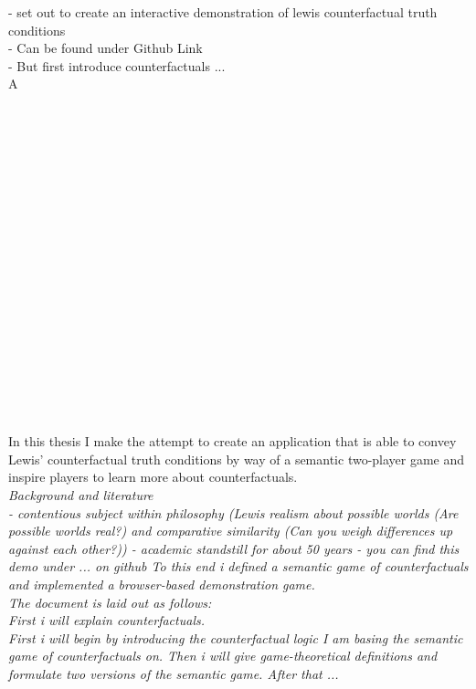 \documentclass[a4paper,american,10pt]{paper}
\theoremstyle{definition}\newtheorem{definition}{Definition}
\begin{document}
- set out to create an interactive demonstration of lewis counterfactual truth conditions\\
- Can be found under Github Link\\
- But first introduce counterfactuals ...\\
A\\\\\\\\\\\\\\\\\\\\\\\\\\\\\\\\\\\\\\\\
In this thesis I make the attempt to create an application that is able to convey Lewis' counterfactual truth conditions by way of a semantic two-player game and inspire players to learn more about counterfactuals.\\
\textit{Background and literature\\
- contentious subject within philosophy (Lewis realism about possible worlds (Are possible worlds real?) and comparative similarity (Can you weigh differences up against each other?))
- academic standstill for about 50 years
- you can find this demo under ... on github
To this end i defined a semantic game of counterfactuals and implemented a browser-based demonstration game.\\
The document is laid out as follows:\\
First i will explain counterfactuals.\\
First i will begin by introducing the counterfactual logic I am basing the semantic game of counterfactuals on. Then i will give game-theoretical definitions and formulate two versions of the semantic game. After that ...}
\end{document}
